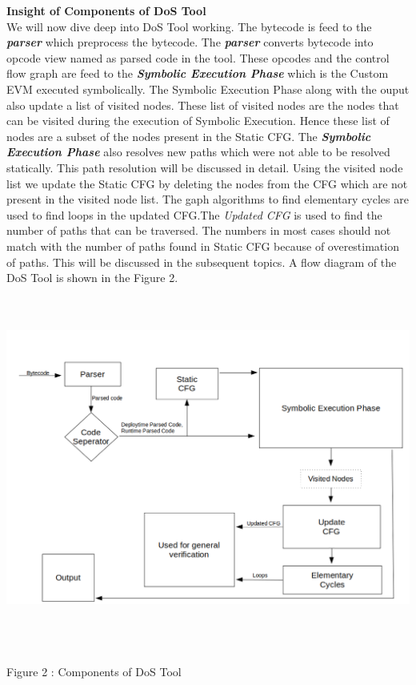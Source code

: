 \documentclass{article}
\begin{document}
\newpage
\noindent \textbf{Insight of Components of DoS Tool}\\
We will now dive deep into DoS Tool working. The bytecode is feed to the \textbf{\emph{parser}} which preprocess the bytecode. The \textbf{\emph{parser}} converts bytecode into opcode view named as parsed code in the tool. These opcodes and the control flow graph are feed to the \textbf{\emph{Symbolic Execution Phase}} which is the Custom EVM executed symbolically. The Symbolic Execution Phase along with the ouput also update a list of visited nodes. These list of visited nodes are the nodes that can be visited during the execution of Symbolic Execution. Hence these list of nodes are a subset of the nodes present in the Static CFG. The \textbf{\emph{Symbolic Execution Phase}} also resolves new paths which were not able to be resolved statically. This path resolution will be discussed in detail. Using the visited node list we update the Static CFG by deleting the nodes from the CFG which are not present in the visited node list. The gaph algorithms to find elementary cycles are used to find loops in the updated CFG.The \emph{Updated CFG} is used to find the number of paths that can be traversed. The numbers in most cases should not match with the number of paths found in Static CFG because of overestimation of paths. This will be discussed in the subsequent topics. A flow diagram of the DoS Tool is shown in the Figure 2.\\
\includegraphics[width = 14cm, height = 12cm]{images/2.png}
\begin{center}
    Figure 2 : Components of DoS Tool
\end{center}
\end{document}
